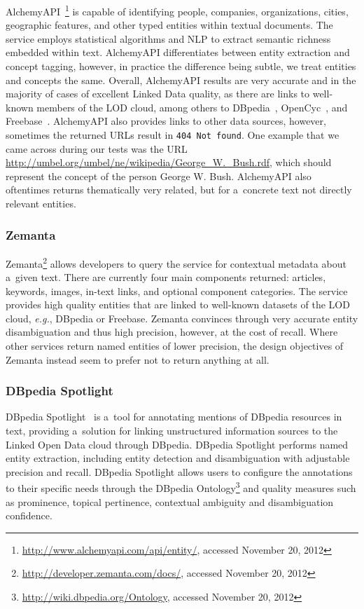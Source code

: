AlchemyAPI~\footnote{\url{http://www.alchemyapi.com/api/entity/},
accessed November 20, 2012}
is capable of identifying people, companies, organizations,
cities, geographic features, and other typed entities within
textual documents.
The service employs statistical algorithms and NLP
to extract semantic richness embedded within text.
AlchemyAPI differentiates between entity extraction and
concept tagging, however, in practice the difference
being subtle, we treat entities and concepts the same.
Overall, AlchemyAPI results are very accurate
and in the majority of cases of excellent Linked Data quality,
as there are links to well-known members of the LOD cloud,
among others to DBpedia~\cite{auer2007dbpedia},
OpenCyc~\cite{lenat1995cyc},
and Freebase~\cite{markoff2007freebase}.
AlchemyAPI also provides links to other data sources, however,
sometimes the returned URLs result in \texttt{404 Not found}.
One example that we came across during our tests was the URL
\url{http://umbel.org/umbel/ne/wikipedia/George\_W.\_Bush.rdf}, which should represent the concept of the person George W. Bush.
AlchemyAPI also oftentimes returns thematically very related,
but for a~concrete text not directly relevant entities.

\subsubsection{Zemanta}

Zemanta\footnote{\url{http://developer.zemanta.com/docs/},
accessed November 20, 2012}
allows developers to query the service for contextual metadata
about a~given text.
There are currently four main components returned:
articles, keywords, images, in-text links, and
optional component categories.
The service provides high quality entities that are linked
to well-known datasets of the LOD cloud, \emph{e.g.},
DBpedia or Freebase.
Zemanta convinces through very accurate entity disambiguation
and thus high precision, however, at the cost of recall.
Where other services return named entities of lower precision,
the design objectives of Zemanta instead seem to prefer
not to return anything at all.

\subsubsection{DBpedia Spotlight}

DBpedia Spotlight~\cite{mendes2011dbpediaspotlight}
is a~tool for annotating mentions of DBpedia resources in text,
providing a~solution for linking unstructured information sources
to the Linked Open Data cloud through DBpedia.
DBpedia Spotlight performs named entity extraction,
including entity detection and disambiguation
with adjustable precision and recall.
DBpedia Spotlight allows users to configure the annotations
to their specific needs through the DBpedia
Ontology\footnote{\url{http://wiki.dbpedia.org/Ontology},
accessed November 20, 2012}
and quality measures such as prominence, topical pertinence,
contextual ambiguity and disambiguation confidence.

